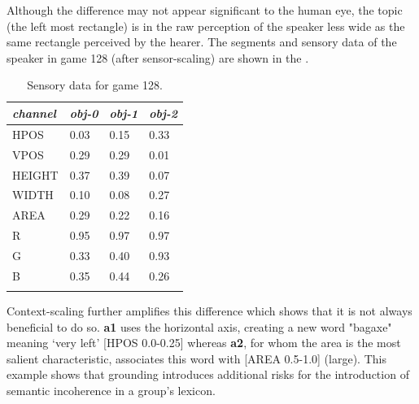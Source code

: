 Although the difference may not appear significant to 
the human eye, the topic (the left most rectangle) is 
in the raw perception of the speaker less wide as the same 
rectangle perceived by the hearer. 
The segments and sensory data of the speaker
in game 128 (after sensor-scaling) are shown in the 
. 
\begin{table}
\begin{center}
\begin{tabular}{ l  l  l  l }
\lsptoprule
{\it channel}& {\it obj-0} & {\it obj-1} & {\it obj-2}\\ \midrule
HPOS & 0.03 & 0.15 & 0.33\\ \midrule
VPOS & 0.29 & 0.29 & 0.01\\ \midrule
HEIGHT & 0.37 & 0.39 & 0.07\\ \midrule
WIDTH & 0.10 & 0.08 & 0.27\\ \midrule
AREA & 0.29 & 0.22 & 0.16\\ \midrule
R & 0.95 & 0.97 & 0.97 \\ \midrule
G & 0.33 & 0.40 & 0.93\\ \midrule
B & 0.35 & 0.44 & 0.26\\ \midrule
\lspbottomrule
\end{tabular}
\caption{ \label{tab:game128} Sensory data for game 128.}
\end{center}
\end{table}
Context-scaling further
amplifies this difference which shows that it is not 
always beneficial to do so. {\bf a1} uses
the horizontal axis, creating a new word "bagaxe" 
meaning `very left' [HPOS 0.0-0.25] whereas {\bf a2}, for
whom the area is the most salient characteristic, 
associates this word with [AREA 0.5-1.0] (large). 
This example shows that grounding introduces 
additional risks for the introduction of semantic
incoherence in a group's lexicon. 

